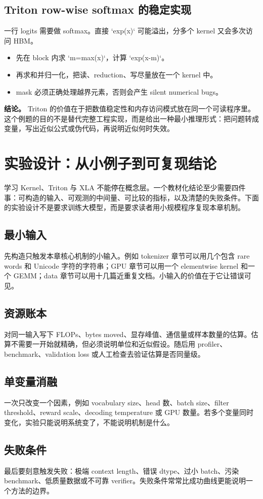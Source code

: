 \documentclass[a4paper]{article}
\begin{document}
\subsection{Triton row-wise softmax 的稳定实现}
一行 logits 需要做 softmax。直接 `exp(x)` 可能溢出，分多个 kernel 又会多次访问 HBM。
\begin{itemize}
\item 先在 block 内求 `m=max(x)`，计算 `exp(x-m)`。
\item 再求和并归一化，把读、reduction、写尽量放在一个 kernel 中。
\item mask 必须正确处理越界元素，否则会产生 silent numerical bugs。
\end{itemize}
\textbf{结论。} Triton 的价值在于把数值稳定性和内存访问模式放在同一个可读程序里。
这个例题的目的不是替代完整工程实现，而是给出一种最小推理形式：把问题转成变量，写出近似公式或伪代码，再说明近似何时失效。
\section{实验设计：从小例子到可复现结论}
学习 Kernel、Triton 与 XLA 不能停在概念层。一个教材化结论至少需要四件事：可构造的输入、可观测的中间量、可比较的指标，以及清楚的失败条件。下面的实验设计不是要求训练大模型，而是要求读者用小规模程序复现本章机制。
\subsection{最小输入}
先构造只触发本章核心机制的小输入。例如 tokenizer 章节可以用几个包含 rare words 和 Unicode 字符的字符串；GPU 章节可以用一个 elementwise kernel 和一个 GEMM；data 章节可以用十几篇近重复文档。小输入的价值在于它让错误可见。
\subsection{资源账本}
对同一输入写下 FLOPs、bytes moved、显存峰值、通信量或样本数量的估算。估算不需要一开始就精确，但必须说明单位和近似假设。随后用 profiler、benchmark、validation loss 或人工检查去验证估算是否同量级。
\subsection{单变量消融}
一次只改变一个因素，例如 vocabulary size、head 数、batch size、filter threshold、reward scale、decoding temperature 或 GPU 数量。若多个变量同时变化，实验只能说明系统变了，不能说明机制是什么。
\subsection{失败条件}
最后要刻意触发失败：极端 context length、错误 dtype、过小 batch、污染 benchmark、低质量数据或不可靠 verifier。失败条件常常比成功曲线更能说明一个方法的边界。
\end{document}
